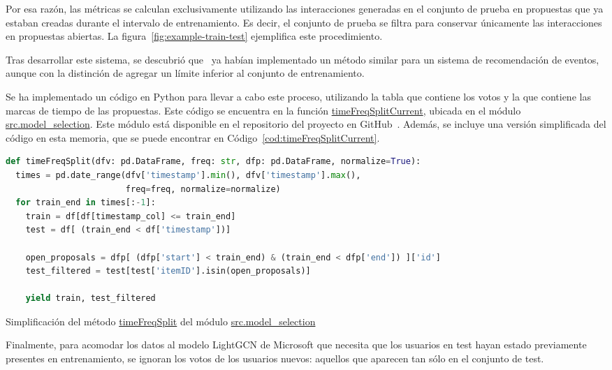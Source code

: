 Por esa razón, las métricas se calculan exclusivamente utilizando las interacciones generadas en el conjunto de prueba en propuestas que ya estaban creadas durante el intervalo de entrenamiento. Es decir, el conjunto de prueba se filtra para conservar únicamente las interacciones en propuestas abiertas. La figura~\ref{fig:example-train-test} ejemplifica este procedimiento.

Tras desarrollar este sistema, se descubrió que~\textcite{macedo_context-aware_2015} ya habían implementado un método similar para un sistema de recomendación de eventos, aunque con la distinción de agregar un límite inferior al conjunto de entrenamiento. %

Se ha implementado un código en Python para llevar a cabo este proceso, utilizando la tabla que contiene los votos y la que contiene las marcas de tiempo de las propuestas. Este código se encuentra en la función \url{timeFreqSplitCurrent}, ubicada en el módulo \url{src.model_selection}. Este módulo está disponible en el repositorio del proyecto en GitHub~\cite{davo_daviddavoupm-tfm-notebooks_2024}. Además, se incluye una versión simplificada del código en esta memoria, que se puede encontrar en Código~\ref{cod:timeFreqSplitCurrent}.

\begin{code}
\begin{lstlisting}[language=Python]
def timeFreqSplit(dfv: pd.DataFrame, freq: str, dfp: pd.DataFrame, normalize=True):
  times = pd.date_range(dfv['timestamp'].min(), dfv['timestamp'].max(), 
                        freq=freq, normalize=normalize)
  for train_end in times[:-1]:
    train = df[df[timestamp_col] <= train_end]
    test = df[ (train_end < df['timestamp'])]
    
    open_proposals = dfp[ (dfp['start'] < train_end) & (train_end < dfp['end']) ]['id']
    test_filtered = test[test['itemID'].isin(open_proposals)]

    yield train, test_filtered
\end{lstlisting}
\caption{Simplificación del método \url{timeFreqSplit} del módulo \url{src.model_selection}}
\label{cod:timeFreqSplitCurrent}
\end{code}

Finalmente, para acomodar los datos al modelo LightGCN de Microsoft que necesita que los usuarios en test hayan estado previamente presentes en entrenamiento, se ignoran los votos de los usuarios nuevos: aquellos que aparecen tan sólo en el conjunto de test.

